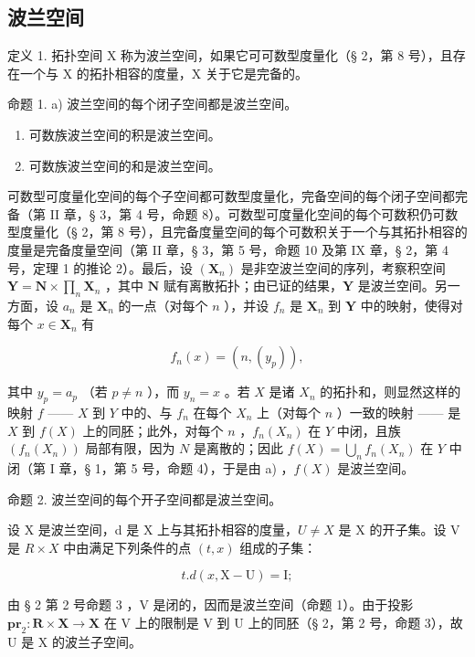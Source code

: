 \subsection{波兰空间}

定义 1. 拓扑空间 X 称为波兰空间，如果它可可数型度量化（§ 2，第 8 号），且存在一个与 X 的拓扑相容的度量，X 关于它是完备的。

命题 1. a) 波兰空间的每个闭子空间都是波兰空间。

\begin{enumerate}
\def\labelenumi{\alph{enumi})}
\setcounter{enumi}{1}
\item
  可数族波兰空间的积是波兰空间。
\item
  可数族波兰空间的和是波兰空间。
\end{enumerate}

可数型可度量化空间的每个子空间都可数型度量化，完备空间的每个闭子空间都完备（第 II 章，§ 3，第 4 号，命题 8）。可数型可度量化空间的每个可数积仍可数型度量化（§ 2，第 8 号），且完备度量空间的每个可数积关于一个与其拓扑相容的度量是完备度量空间（第 II 章，§ 3，第 5 号，命题 10 及第 IX 章，§ 2，第 4 号，定理 1 的推论 2）。最后，设 \((\mathbf{X}_n)\) 是非空波兰空间的序列，考察积空间 \(\mathbf{Y} = \mathbf{N} \times \prod_{n} \mathbf{X}_n\) ，其中 \(\mathbf{N}\) 赋有离散拓扑；由已证的结果，\(\mathbf{Y}\) 是波兰空间。另一方面，设 \(a_n\) 是 \(\mathbf{X}_n\) 的一点（对每个 \(n\) ），并设 \(f_n\) 是 \(\mathbf{X}_n\) 到 \(\mathbf{Y}\) 中的映射，使得对每个 \(x \in \mathbf{X}_n\) 有

\[
f _ {n} (x) = (n, \left(y _ {p}\right)),
\]

其中 \(y_{p} = a_{p}\) （若 \(p \neq n\) ），而 \(y_{n} = x\) 。若 \(X\) 是诸 \(X_{n}\) 的拓扑和，则显然这样的映射 \(f\) —— \(X\) 到 \(Y\) 中的、与 \(f_{n}\) 在每个 \(X_{n}\) 上（对每个 \(n\) ）一致的映射 —— 是 \(X\) 到 \(f(X)\) 上的同胚；此外，对每个 \(n\) ，\(f_{n}(X_{n})\) 在 \(Y\) 中闭，且族 \((f_{n}(X_{n}))\) 局部有限，因为 \(N\) 是离散的；因此 \(f(X) = \bigcup_{n} f_{n}(X_{n})\) 在 \(Y\) 中闭（第 I 章，§ 1，第 5 号，命题 4），于是由 a) ，\(f(X)\) 是波兰空间。

命题 2. 波兰空间的每个开子空间都是波兰空间。

设 X 是波兰空间，d 是 X 上与其拓扑相容的度量，\(U \neq X\) 是 X 的开子集。设 V 是 \(R \times X\) 中由满足下列条件的点 \((t, x)\) 组成的子集：

\[
t. d (x, \mathrm{X} - \mathrm{U}) = \mathrm{I};
\]

由 § 2 第 2 号命题 3 ，V 是闭的，因而是波兰空间（命题 1）。由于投影 \(\mathbf{pr}_{2}:\mathbf{R}\times\mathbf{X}\to\mathbf{X}\) 在 V 上的限制是 V 到 U 上的同胚（§ 2，第 2 号，命题 3），故 U 是 X 的波兰子空间。

